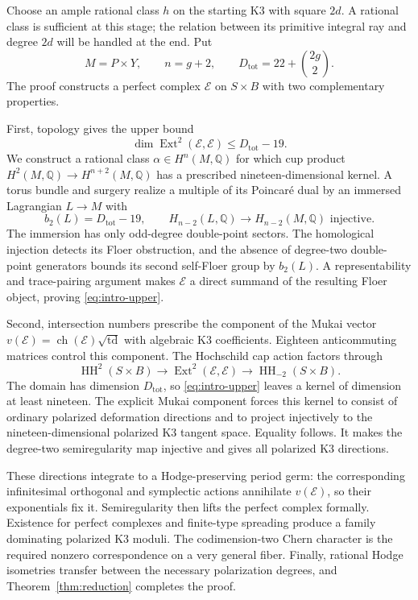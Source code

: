 \documentclass[11pt]{article}
\numberwithin{equation}{section}
\theoremstyle{definition}
\theoremstyle{remark}
\begin{document}
Choose an ample rational class $h$ on the starting K3 with square
$2d$.  A rational class is sufficient at this stage; the relation
between its primitive integral ray and degree $2d$ will be handled
at the end.  Put
\[
             M=P\times Y,\qquad n=g+2,\qquad
             D_{\mathrm{tot}}=22+\binom{2g}{2}.
\]
The proof constructs a perfect complex $\mathcal E$ on $S\times B$
with two complementary properties.

First, topology gives the upper bound
\begin{equation}
             \dim\operatorname{Ext}^2(\mathcal E,\mathcal E)
                    \le D_{\mathrm{tot}}-19.
 \label{eq:intro-upper}
\end{equation}
We construct a rational class $\alpha\in H^n(M,\mathbb Q)$ for which
cup product $H^2(M,\mathbb Q)\to H^{n+2}(M,\mathbb Q)$ has a prescribed
nineteen-dimensional kernel.  A torus bundle and surgery realize
a multiple of its Poincar\'e dual by an immersed Lagrangian
$L\to M$ with
\[
       b_2(L)=D_{\mathrm{tot}}-19,
       \qquad H_{n-2}(L,\mathbb Q)\longrightarrow H_{n-2}(M,\mathbb Q)
       \text{ injective}.
\]
The immersion has only odd-degree double-point sectors.  The
homological injection detects its Floer obstruction, and the
absence of degree-two double-point generators bounds its second
self-Floer group by $b_2(L)$.  A representability and trace-pairing
argument makes $\mathcal E$ a direct summand of the resulting
Floer object, proving \eqref{eq:intro-upper}.

Second, intersection numbers prescribe the component of the Mukai
vector $v(\mathcal E)=\operatorname{ch}(\mathcal E)\sqrt{\operatorname{td}}$ with algebraic
K3 coefficients.  Eighteen anticommuting matrices control this
component.  The Hochschild cap action factors through
\[
 \operatorname{HH}^2(S\times B)\longrightarrow\operatorname{Ext}^2(\mathcal E,\mathcal E)
                         \longrightarrow\operatorname{HH}_{-2}(S\times B).
\]
The domain has dimension $D_{\mathrm{tot}}$, so
\eqref{eq:intro-upper} leaves a kernel of dimension at least
nineteen.  The explicit Mukai component forces this kernel to
consist of ordinary polarized deformation directions and to
project injectively to the nineteen-dimensional polarized K3
tangent space.  Equality follows.  It makes the degree-two
semiregularity map injective and gives all polarized K3 directions.

These directions integrate to a Hodge-preserving period germ:
the corresponding infinitesimal orthogonal and symplectic actions
annihilate $v(\mathcal E)$, so their exponentials fix it.
Semiregularity then lifts the perfect complex formally.  Existence
for perfect complexes and finite-type spreading produce a family
dominating polarized K3 moduli.  The codimension-two Chern
character is the required nonzero correspondence on a very
general fiber.  Finally, rational Hodge isometries transfer
between the necessary polarization degrees, and
Theorem~\ref{thm:reduction} completes the proof.
\end{document}
